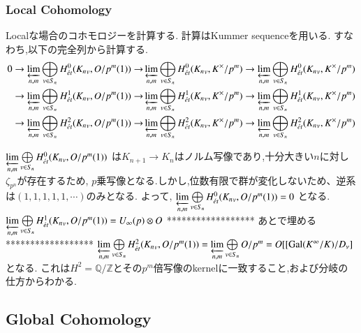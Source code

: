 \documentclass{ujarticle}
\begin{document}
\subsubsection{Local Cohomology}
\label{subs:Local Cohomology}
Localな場合のコホモロジーを計算する.
計算はKummer sequenceを用いる.
すなわち,以下の完全列から計算する.
\begin{equation*}
\begin{split}
0 \rightarrow   \varprojlim\limits_{n,m}\bigoplus\limits_{v \in S_n}H^0_{\acute{e}t}({K_n}_v,O/p^m(1)) \rightarrow &\varprojlim\limits_{n,m}\bigoplus\limits_{v \in S_n}H^0_{\acute{e}t}({K_n}_v,K^{\times}/p^m) \rightarrow \varprojlim\limits_{n,m}\bigoplus\limits_{v \in S_n}H^0_{\acute{e}t}({K_n}_v,K^{\times}/p^m)\\
  \rightarrow  \varprojlim\limits_{n,m}\bigoplus\limits_{v \in S_n}H^1_{\acute{e}t}({K_n}_v,O/p^m(1)) \rightarrow &\varprojlim\limits_{n,m}\bigoplus\limits_{v \in S_n}H^1_{\acute{e}t}({K_n}_v,K^{\times}/p^m) \rightarrow \varprojlim\limits_{n,m}\bigoplus\limits_{v \in S_n}H^1_{\acute{e}t}({K_n}_v,K^{\times}/p^m)\\
  \rightarrow \varprojlim\limits_{n,m}\bigoplus\limits_{v \in S_n}H^2_{\acute{e}t}({K_n}_v,O/p^m(1))  \rightarrow &\varprojlim\limits_{n,m}\bigoplus\limits_{v \in S_n}H^2_{\acute{e}t}({K_n}_v,K^{\times}/p^m) \rightarrow \varprojlim\limits_{n,m}\bigoplus\limits_{v \in S_n}H^2_{\acute{e}t}({K_n}_v,K^{\times}/p^m)
\end{split}
\end{equation*}

$\varprojlim\limits_{n,m}\bigoplus\limits_{v \in S_n}H^0_{\acute{e}t}({K_n}_v,O/p^m(1))$
は$K_{n+1} \to K_n$はノルム写像であり,十分大きい$n$に対し$\zeta_{p^n}$が存在するため,
$p$乗写像となる.しかし,位数有限で群が変化しないため、逆系は$(1,1,1,1,1,\cdots)$のみとなる.
よって,
$\varprojlim\limits_{n,m}\bigoplus\limits_{v \in S_n}H^0_{\acute{e}t}({K_n}_v,O/p^m(1))=0$
となる.
$\varprojlim\limits_{n,m}\bigoplus\limits_{v \in S_n}H^1_{\acute{e}t}({K_n}_v,O/p^m(1))=U_{\infty}(p) \otimes O$
******************
 あとで埋める
 ******************
$\varprojlim\limits_{n,m}\bigoplus\limits_{v \in S_n}H^2_{\acute{e}t}({K_n}_v,O/p^m(1))= \varprojlim\limits_{n,m}\bigoplus\limits_{v \in S_n}O/p^m =
O[[\mathrm{Gal}(K^{\infty}/K)/D_{\nu}]$
となる.
これは$H^2 = \mathbb{Q}/\mathbb{Z}$とその$p^m$倍写像のkernelに一致すること,および分岐の仕方からわかる.

\subsection{Global Cohomology}
\label{sub:Global Cohomology}
\end{document}
